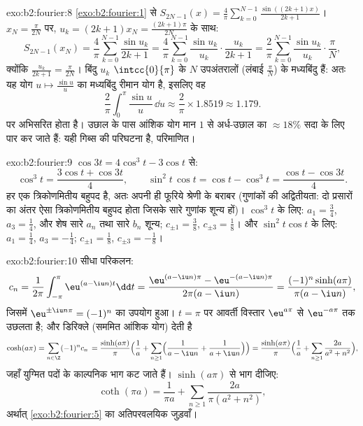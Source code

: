 \begin{solution}{exo:b2:fourier:8}
\cref{exo:b2:fourier:1} से $S_{2N-1}(x) =
\frac4\pi\sum_{k=0}^{N-1}\frac{\sin((2k+1)x)}{2k+1}$। $x_N =
\frac{\pi}{2N}$ पर, $u_k = (2k+1)x_N = \frac{(2k+1)\pi}{2N}$ के साथ:
\[
S_{2N-1}(x_N) = \frac{4}{\pi}\sum_{k=0}^{N-1}\frac{\sin u_k}{2k+1}
= \frac{4}{\pi}\sum_{k=0}^{N-1}\frac{\sin u_k}{u_k}\cdot
\frac{u_k}{2k+1}
= \frac{2}{\pi}\sum_{k=0}^{N-1}\frac{\sin u_k}{u_k}\cdot
\frac{\pi}{N},
\]
क्योंकि $\frac{u_k}{2k+1} = \frac{\pi}{2N}$। बिंदु $u_k$ $\intcc{0}{\pi}$ के $N$ उपअंतरालों (लंबाई $\frac{\pi}{N}$) के मध्यबिंदु
हैं: अतः यह योग  $u \mapsto \frac{\sin u}{u}$ का मध्यबिंदु रीमान योग है, इसलिए वह
\[
\frac{2}{\pi}\int_0^\pi \frac{\sin u}{u}\,\dd u
\approx \frac{2}{\pi}\times 1.8519 \approx 1.179 .
\]
पर अभिसरित होता है। उछाल के पास आंशिक योग मान $1$ से अर्ध-उछाल का $\approx
18\%$
सदा के लिए पार कर जाते हैं: यही गिब्स की परिघटना है, परिमाणित।
\end{solution}

\begin{solution}{exo:b2:fourier:9}
$\cos 3t = 4\cos^3t - 3\cos t$ से:
\[
\cos^3 t = \frac{3\cos t + \cos 3t}{4},
\qquad
\sin^2t\,\cos t = \cos t - \cos^3 t
= \frac{\cos t - \cos 3t}{4} .
\]
हर एक त्रिकोणमितीय बहुपद है, अतः अपनी ही फूरिये श्रेणी के बराबर (गुणांकों
की अद्वितीयता: दो प्रसारों का अंतर ऐसा त्रिकोणमितीय बहुपद होता जिसके सारे
गुणांक शून्य हों)। $\cos^3t$ के लिए: $a_1 = \frac34$, $a_3 =
\frac14$, और शेष सारे $a_n$ तथा सारे $b_n$
शून्य; $c_{\pm1} =
\frac38$, $c_{\pm3} = \frac18$। और $\sin^2t\cos t$ के लिए: $a_1 =
\frac14$, $a_3 = -\frac14$; $c_{\pm1} = \frac18$, $c_{\pm3} =
-\frac18$।
\end{solution}

\begin{solution}{exo:b2:fourier:10}
सीधा परिकलन:
\[
c_n = \frac{1}{2\pi}\int_{-\pi}^{\pi}\eu^{(a - \iu n)t}\dd t
= \frac{\eu^{(a-\iu n)\pi} - \eu^{-(a - \iu n)\pi}}
{2\pi(a - \iu n)}
= \frac{(-1)^n\sinh(a\pi)}{\pi(a - \iu n)} ,
\]
जिसमें $\eu^{\pm\iu n\pi} = (-1)^n$ का उपयोग हुआ। $t = \pi$ पर आवर्ती विस्तार $\eu^{a\pi}$ से $\eu^{-a\pi}$ तक उछलता है;
और डिरिक्ले (सममित आंशिक योग) देती है
\[
\cosh(a\pi) = \sum_{n\in\Z}(-1)^n c_n\,
= \frac{\sinh(a\pi)}{\pi}\Bigl(\frac1a +
\sum_{n\geq1}\Bigl(\frac{1}{a - \iu n} +
\frac{1}{a + \iu n}\Bigr)\Bigr)
= \frac{\sinh(a\pi)}{\pi}\Bigl(\frac1a +
\sum_{n\geq1}\frac{2a}{a^2 + n^2}\Bigr) ,
\]
जहाँ युग्मित पदों के काल्पनिक भाग कट जाते हैं। $\sinh(a\pi)$ से भाग दीजिए:
\[
\coth(\pi a) = \frac{1}{\pi a} +
\sum_{n\geq1}\frac{2a}{\pi(a^2 + n^2)} ,
\]
अर्थात् \cref{exo:b2:fourier:5} का अतिपरवलयिक जुड़वाँ।
\end{solution}

